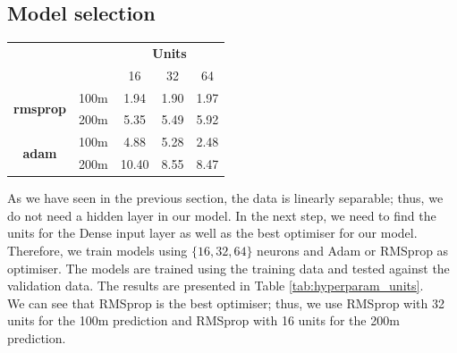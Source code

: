 \subsection{Model selection}
\begin{centering}
\begin{tabular}{|cc|c|c|c|}\hline
    &&\multicolumn{3}{c|}{\textbf{Units}}\\
    & & 16 & 32 & 64 \\\hline
    \multirow{2}{*}{\textbf{rmsprop}}&100m&1.94&1.90&1.97\\\cline{2-5}
    &200m&5.35&5.49&5.92\\\hline
    \multirow{2}{*}{\textbf{adam}}&100m&4.88&5.28&2.48\\\cline{2-5}
    &200m&10.40&8.55&8.47\\\hline
\end{tabular}
\label{tab:hyperparam_units}
\end{centering}
As we have seen in the previous section, the data is linearly separable; thus, we do not need a hidden layer in our model. In the next step, we need to find the units for the Dense input layer as well as the best optimiser for our model. Therefore, we train models using $\{16, 32, 64\}$ neurons and Adam or RMSprop as optimiser. The models are trained using the training data and tested against the validation data. The results are presented in Table \ref{tab:hyperparam_units}.\\
We can see that RMSprop is the best optimiser; thus, we use RMSprop with 32 units for the 100m prediction and RMSprop with 16 units for the 200m prediction.
